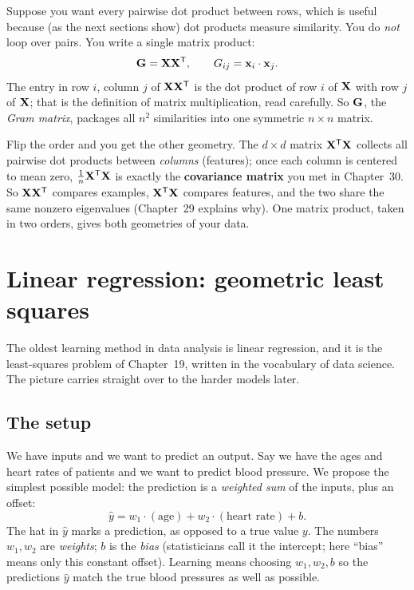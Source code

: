 Suppose you want every pairwise dot
product between rows, which is useful because (as the next sections show) dot products
measure similarity. You do \emph{not} loop over pairs. You write a single matrix product:
\[
\mathbf{G} = \mathbf{X}\mathbf{X}^{\mathsf{T}}, \qquad G_{ij} = \mathbf{x}_i \cdot \mathbf{x}_j .
\]
The entry in row $i$, column $j$ of $\mathbf{X}\mathbf{X}^{\mathsf{T}}$ is the dot product of row $i$ of
$\mathbf{X}$ with row $j$ of $\mathbf{X}$; that is the definition of matrix
multiplication, read carefully. So $\mathbf{G}$, the \emph{Gram matrix}, packages all
$n^2$ similarities into one symmetric $n\times n$ matrix.

Flip the order and you get the other geometry. The $d \times d$ matrix
$\mathbf{X}^{\mathsf{T}}\mathbf{X}$ collects all pairwise dot products between \emph{columns} (features);
once each column is centered to mean zero, $\tfrac1n\mathbf{X}^{\mathsf{T}}\mathbf{X}$ is exactly the
\textbf{covariance matrix} you met in Chapter~30. So $\mathbf{X}\mathbf{X}^{\mathsf{T}}$ compares
examples, $\mathbf{X}^{\mathsf{T}}\mathbf{X}$ compares features, and the two share the same nonzero
eigenvalues (Chapter~29 explains why). One matrix product, taken in two orders, gives
both geometries of your data.

\section{Linear regression: geometric least squares}
\label{ch34:linreg}

The oldest learning method in data analysis is linear regression, and it is the
least-squares problem of Chapter~19, written in the vocabulary of data science. The
picture carries straight over to the harder models later.

\subsection{The setup}

We have inputs and we want to predict an output. Say we have the ages and heart rates of
patients and we want to predict blood pressure. We propose the simplest possible model:
the prediction is a \emph{weighted sum} of the inputs, plus an offset:
\[
\hat{y} = w_1 \cdot (\text{age}) + w_2 \cdot (\text{heart rate}) + b.
\]
The hat in $\hat{y}$ marks a prediction, as opposed to a true value $y$. The numbers
$w_1, w_2$ are \emph{weights}; $b$ is the \emph{bias} (statisticians call it the
intercept; here ``bias'' means only this constant offset). Learning means choosing
$w_1, w_2, b$ so the predictions $\hat{y}$ match the true blood pressures as well as
possible.

